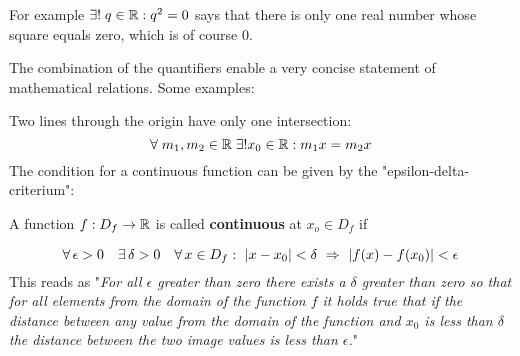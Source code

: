 For example $\exists ! \; q \in \mathbb{R}: q^2=0$ says that there is only one real number whose square equals zero, which is of course 0. 

The combination of the quantifiers enable a very concise statement of mathematical relations. Some examples:

\begin{ex}
\noindent Two lines through the origin have only one intersection:
\begin{equation*}
    \forall \; m_1, m_2 \in \mathbb{R} \; \exists! x_0 \in \mathbb{R} : m_1 x = m_2 x
\end{equation*}
\noindent The condition for a continuous function can be given by the "epsilon-delta-criterium": 
\par A function $f: D_f \rightarrow \mathbb{R}$ is called \textbf{continuous}  at $x_o \in D_f$ if \par
\begin{equation*}
    \forall \, \epsilon > 0 \quad  \exists \, \delta > 0 \quad  \forall \, x \in D_f : \ \abs{x-x_0} < \delta \  \Rightarrow  \ \abs{f(x) - f(x_0)} < \epsilon
\end{equation*}
\noindent This reads as "\textit{For all $\epsilon$ greater than zero there exists a $\delta$ greater than zero so that for all elements from the domain of the function $f$ it holds true that if the distance between any value from the domain of the function and $x_0$ is less than $\delta$ the distance between the two image values is less than $\epsilon$.}" 
\end{ex}

